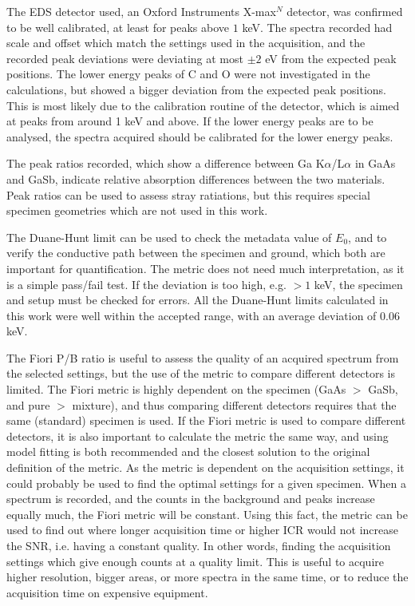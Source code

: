 The EDS detector used, an Oxford Instruments X-max$^N$ detector, was confirmed to be well calibrated, at least for peaks above $1$ keV.
The spectra recorded had scale and offset which match the settings used in the acquisition, and the recorded peak deviations were deviating at most $\pm 2$ eV from the expected peak positions.
The lower energy peaks of C and O were not investigated in the calculations, but showed a bigger deviation from the expected peak positions.
This is most likely due to the calibration routine of the detector, which is aimed at peaks from around 1 keV and above.
If the lower energy peaks are to be analysed, the spectra acquired should be calibrated for the lower energy peaks.


The peak ratios recorded, which show a difference between Ga K$\alpha$/L$\alpha$ in GaAs and GaSb, indicate relative absorption differences between the two materials.
Peak ratios can be used to assess stray ratiations, but this requires special specimen geometries which are not used in this work.

The Duane-Hunt limit can be used to check the metadata value of $E_0$, and to verify the conductive path between the specimen and ground, which both are important for quantification.
The metric does not need much interpretation, as it is a simple pass/fail test.
If the deviation is too high, e.g. $>1$ keV, the specimen and setup must be checked for errors.
All the Duane-Hunt limits calculated in this work were well within the accepted range, with an average deviation of $0.06$ keV.

The Fiori P/B ratio is useful to assess the quality of an acquired spectrum from the selected settings, but the use of the metric to compare different detectors is limited.
The Fiori metric is highly dependent on the specimen (GaAs $>$ GaSb, and pure $>$ mixture), and thus comparing different detectors requires that the same (standard) specimen is used.
If the Fiori metric is used to compare different detectors, it is also important to calculate the metric the same way, and using model fitting is both recommended and the closest solution to the original definition of the metric.
As the metric is dependent on the acquisition settings, it could probably be used to find the optimal settings for a given specimen.
When a spectrum is recorded, and the counts in the background and peaks increase equally much, the Fiori metric will be constant.
Using this fact, the metric can be used to find out where longer acquisition time or higher ICR would not increase the SNR, i.e. having a constant quality.
In other words, finding the acquisition settings which give enough counts at a quality limit.
This is useful to acquire higher resolution, bigger areas, or more spectra in the same time, or to reduce the acquisition time on expensive equipment.



